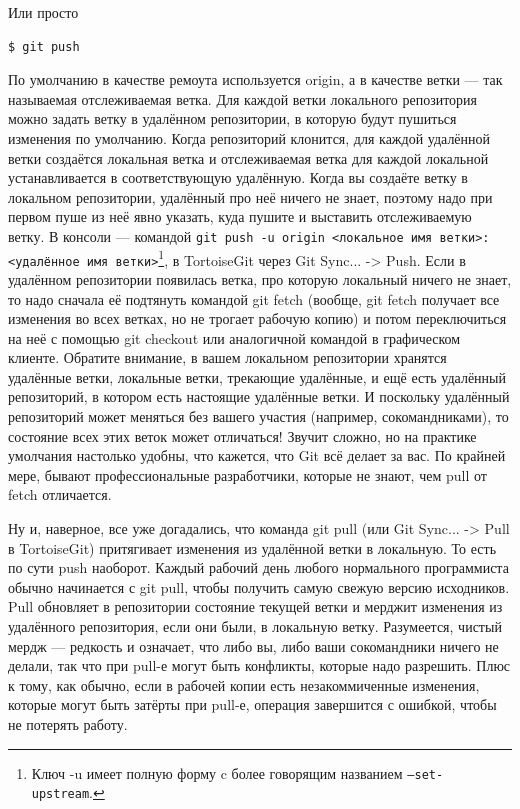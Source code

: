 \documentclass{../../text-style}
\begin{document}
Или просто

\begin{verbatim}
$ git push
\end{verbatim}

По умолчанию в качестве ремоута используется origin, а в качестве ветки --- так называемая отслеживаемая ветка. Для каждой ветки локального репозитория можно задать ветку в удалённом репозитории, в которую будут пушиться изменения по умолчанию. Когда репозиторий клонится, для каждой удалённой ветки создаётся локальная ветка и отслеживаемая ветка для каждой локальной устанавливается в соответствующую удалённую. Когда вы создаёте ветку в локальном репозитории, удалённый про неё ничего не знает, поэтому надо при первом пуше из неё явно указать, куда пушите и выставить отслеживаемую ветку. В консоли --- командой \verb|git push -u origin <локальное имя ветки>:<удалённое имя ветки>|\footnote{Ключ -u имеет полную форму c более говорящим названием \texttt{--set-upstream}.}, в TortoiseGit через Git Sync... -> Push. Если в удалённом репозитории появилась ветка, про которую локальный ничего не знает, то надо сначала её подтянуть командой git fetch (вообще, git fetch получает все изменения во всех ветках, но не трогает рабочую копию) и потом переключиться на неё с помощью git checkout или аналогичной командой в графическом клиенте. Обратите внимание, в вашем локальном репозитории хранятся удалённые ветки, локальные ветки, трекающие удалённые, и ещё есть удалённый репозиторий, в котором есть настоящие удалённые ветки. И поскольку удалённый репозиторий может меняться без вашего участия (например, сокомандниками), то состояние всех этих веток может отличаться! Звучит сложно, но на практике умолчания настолько удобны, что кажется, что Git всё делает за вас. По крайней мере, бывают профессиональные разработчики, которые не знают, чем pull от fetch отличается.

Ну и, наверное, все уже догадались, что команда git pull (или Git Sync... -> Pull в TortoiseGit) притягивает изменения из удалённой ветки в локальную. То есть по сути push наоборот. Каждый рабочий день любого нормального программиста обычно начинается с git pull, чтобы получить самую свежую версию исходников. Pull обновляет в репозитории состояние текущей ветки и мерджит изменения из удалённого репозитория, если они были, в локальную ветку. Разумеется, чистый мердж --- редкость и означает, что либо вы, либо ваши сокомандники ничего не делали, так что при pull-е могут быть конфликты, которые надо разрешить. Плюс к тому, как обычно, если в рабочей копии есть незакоммиченные изменения, которые могут быть затёрты при pull-е, операция завершится с ошибкой, чтобы не потерять работу.
\end{document}
